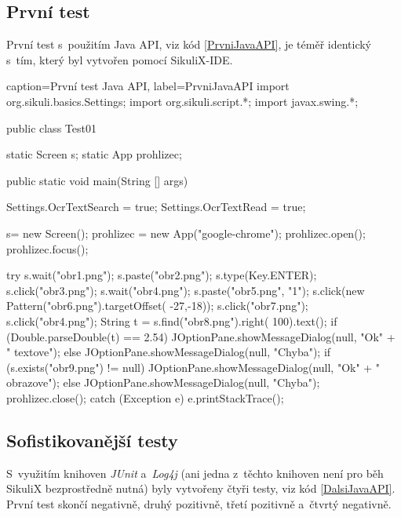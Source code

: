 		\subsection{První test}
		První test s~použitím Java API, viz kód \ref{PrvniJavaAPI}, je téměř identický s~tím, který byl vytvořen pomocí SikuliX-IDE.
		
			\begin{lstjava}{caption={První test Java API}, label={PrvniJavaAPI}}
import org.sikuli.basics.Settings;
import org.sikuli.script.*;
import javax.swing.*;

public class Test01 {

  static Screen s;
  static App prohlizec;
  
  public static void main(String [] args) {
    Settings.OcrTextSearch = true;
    Settings.OcrTextRead = true;

    s= new Screen();
    prohlizec = new App("google-chrome");
    prohlizec.open();
    prohlizec.focus();
    
    try {
      s.wait("obr1.png");
      s.paste("obr2.png");
      s.type(Key.ENTER);
      s.click("obr3.png");
      s.wait("obr4.png");
      s.paste("obr5.png", "1");
      s.click(new Pattern("obr6.png").targetOffset(
        -27,-18));
      s.click("obr7.png");
      s.click("obr4.png");
      String t = s.find("obr8.png").right(
        100).text();
      if (Double.parseDouble(t) == 2.54) {
        JOptionPane.showMessageDialog(null, "Ok" +
          " textove");
      } else {
        JOptionPane.showMessageDialog(null, "Chyba");
      }
      if (s.exists("obr9.png") != null) {
        JOptionPane.showMessageDialog(null, "Ok" +
          " obrazove");
      } else {
        JOptionPane.showMessageDialog(null, "Chyba");
      }
      prohlizec.close();
    } catch (Exception e) {
      e.printStackTrace();
    }
  }
}
			\end{lstjava}
	
		\subsection{Sofistikovanější testy}
		S~využitím knihoven \emph{JUnit} a~\emph{Log4j} (ani jedna z~těchto knihoven není pro běh SikuliX bezprostředně nutná) byly vytvořeny čtyři testy, viz kód \ref{DalsiJavaAPI}. První test skončí negativně, druhý pozitivně, třetí pozitivně a~čtvrtý negativně.